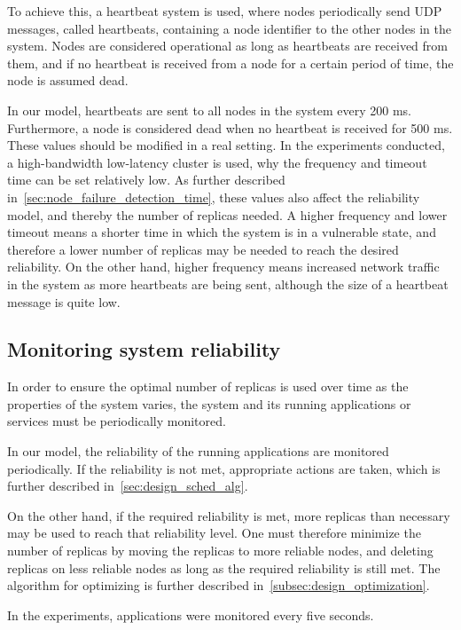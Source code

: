 \documentclass{cslthse-msc}
\begin{document}
To achieve this, a heartbeat system is used, where nodes periodically send UDP messages, called heartbeats, containing a node identifier to the other nodes in the system. Nodes are considered operational as long as heartbeats are received from them, and if no heartbeat is received from a node for a certain period of time, the node is assumed dead.

In our model, heartbeats are sent to all nodes in the system every 200 ms. Furthermore, a node is considered dead when no heartbeat is received for 500 ms. These values should be modified in a real setting. In the experiments conducted, a high-bandwidth low-latency cluster is used, why the frequency and timeout time can be set relatively low. As further described in~\cref{sec:node_failure_detection_time}, these values also affect the reliability model, and thereby the number of replicas needed. A higher frequency and lower timeout means a shorter time in which the system is in a vulnerable state, and therefore a lower number of replicas may be needed to reach the desired reliability. On the other hand, higher frequency means increased network traffic in the system as more heartbeats are being sent, although the size of a heartbeat message is quite low. %

\subsection{Monitoring system reliability} \label{subsec:monitoring_system_rel}
In order to ensure the optimal number of replicas is used over time as the properties of the system varies, the system and its running applications or services must be periodically monitored. 

In our model, the reliability of the running applications are monitored periodically. If the reliability is not met, appropriate actions are taken, which is further described in~\cref{sec:design_sched_alg}.

On the other hand, if the required reliability is met, more replicas than necessary may be used to reach that reliability level. One must therefore minimize the number of replicas by moving the replicas to more reliable nodes, and deleting replicas on less reliable nodes as long as the required reliability is still met. The algorithm for optimizing is further described in~\cref{subsec:design_optimization}.

In the experiments, applications were monitored every five seconds.
\end{document}
